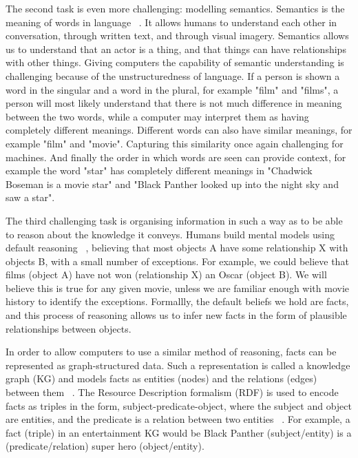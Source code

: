 \noindent The second task is even more challenging: modelling semantics. Semantics is the meaning of words in language \unskip~\citep{chomsky1955logical}. It allows humans to understand each other in conversation, through written text, and through visual imagery. Semantics allows us to understand that an actor is a thing, and that things can have relationships with other things. Giving computers the capability of semantic understanding is challenging because of the unstructuredness of language. If a person is shown a word in the singular and a word in the plural, for example "film" and "films", a person will most likely understand that there is not much difference in meaning between the two words, while a computer may interpret them as having completely different meanings. Different words can also have similar meanings, for example "film" and "movie". Capturing this similarity once again challenging for machines. And finally the order in which words are seen can provide context, for example the word "star" has completely different meanings in "Chadwick Boseman is a movie star" and "Black Panther looked up into the night sky and saw a star". \par

\noindent The third challenging task is organising information in such a way as to be able to reason about the knowledge it conveys. Humans build mental models using default reasoning \unskip~\citep{reiter1980logic}, believing that most objects A have some relationship X with objects B, with a small number of exceptions. For example, we could believe that films (object A) have not won (relationship X) an Oscar (object B). We will believe this is true for any given movie, unless we are familiar enough with movie history to identify the exceptions. Formallly, the default beliefs we hold are facts, and this process of reasoning allows us to infer new facts in the form of plausible relationships between objects. \par

\noindent In order to allow computers to use a similar method of reasoning, facts can be represented as graph-structured data. Such a representation is called a knowledge graph (KG) and models facts as entities (nodes) and the relations (edges) between them \unskip~\citep{nickel2015review}. The Resource Description formalism (RDF) is used to encode facts as triples in the form, subject-predicate-object, where the subject and object are entities, and the predicate is a relation between two entities \unskip~\citep{bizer2009dbpedia}. For example, a fact (triple) in an entertainment KG would be Black Panther (subject/entity) is a (predicate/relation) super hero (object/entity). \par


